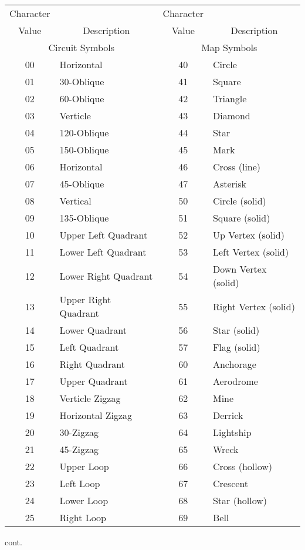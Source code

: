 \begin{tabular}{|c|l|c|l|}
\hline
\multicolumn{1}{|c|}{Character}
& & \multicolumn{1}{|c|}{Character}&\\
\multicolumn{1}{|c|}{Value}
&\multicolumn{1}{|c|}{Description}
&\multicolumn{1}{|c|}{Value}
&\multicolumn{1}{|c|}{Description}\\
\hline
\multicolumn{2}{|c|}{Circuit Symbols}
&\multicolumn{2}{|c|}{Map Symbols}\\
\hline
00 & Horizontal & 40 & Circle\\
01 & 30-Oblique & 41 & Square\\
02 & 60-Oblique & 42 & Triangle\\
03 & Verticle & 43 & Diamond\\
04 & 120-Oblique & 44 & Star\\
05 & 150-Oblique & 45 & Mark\\
06 & Horizontal & 46 & Cross (line)\\
07 & 45-Oblique & 47 & Asterisk\\
08 & Vertical & 50 & Circle (solid)\\
09 & 135-Oblique & 51 & Square (solid)\\
10 & Upper Left Quadrant & 52 & Up Vertex (solid)\\
11 & Lower Left Quadrant & 53 & Left Vertex (solid)\\
12 & Lower Right Quadrant & 54 & Down Vertex (solid)\\
13 & Upper Right Quadrant & 55 & Right Vertex (solid)\\
14 & Lower Quadrant & 56 & Star (solid)\\
15 & Left Quadrant & 57 & Flag (solid)\\
16 & Right Quadrant & 60 & Anchorage\\
17 & Upper Quadrant & 61 & Aerodrome\\
18 & Verticle Zigzag & 62 & Mine\\
19 & Horizontal Zigzag & 63 & Derrick\\
20 & 30-Zigzag & 64 & Lightship\\
21 & 45-Zigzag & 65 & Wreck\\
22 & Upper Loop & 66 & Cross (hollow)\\
23 & Left Loop & 67 & Crescent\\
24 & Lower Loop & 68 & Star (hollow)\\
25 & Right Loop & 69 & Bell\\ \hline
\end{tabular}
\newpage
cont.

